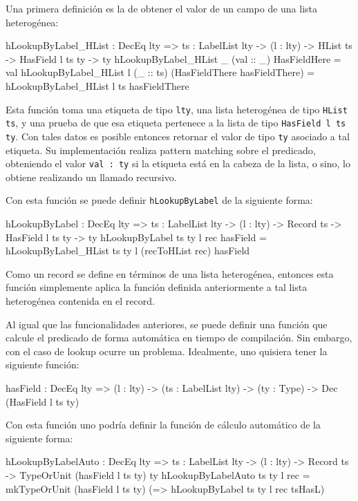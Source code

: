 Una primera definición es la de obtener el valor de un campo de una lista heterogénea:

\begin{code}
hLookupByLabel_HList : DecEq lty => {ts : LabelList lty} ->
  (l : lty) -> HList ts -> HasField l ts ty -> ty
hLookupByLabel_HList _ (val :: _) HasFieldHere = val
hLookupByLabel_HList l (_ :: ts) 
  (HasFieldThere hasFieldThere) =
  hLookupByLabel_HList l ts hasFieldThere
\end{code}

Esta función toma una etiqueta de tipo \texttt{lty}, una lista heterogénea de tipo \texttt{HList ts}, y una prueba de que esa etiqueta pertenece a la lista de tipo \texttt{HasField l ts ty}. Con tales datos es posible entonces retornar el valor de tipo \texttt{ty} asociado a tal etiqueta. Su implementación realiza pattern matching sobre el predicado, obteniendo el valor \texttt{val : ty} si la etiqueta está en la cabeza de la lista, o sino, lo obtiene realizando un llamado recursivo.

Con esta función se puede definir \texttt{hLookupByLabel} de la siguiente forma:

\begin{code}
hLookupByLabel : DecEq lty => {ts : LabelList lty} ->
  (l : lty) -> Record ts -> HasField l ts ty -> ty
hLookupByLabel {ts} {ty} l rec hasField =
  hLookupByLabel_HList {ts} {ty} l (recToHList rec) hasField
\end{code}

Como un record se define en términos de una lista heterogénea, entonces esta función simplemente aplica la función definida anteriormente a tal lista heterogénea contenida en el record.

Al igual que las funcionalidades anteriores, se puede definir una función que calcule el predicado de forma automática en tiempo de compilación. Sin embargo, con el caso de lookup ocurre un problema. Idealmente, uno quisiera tener la siguiente función:

\begin{code}
hasField : DecEq lty => (l : lty) ->
  (ts : LabelList lty) -> (ty : Type) ->
  Dec (HasField l ts ty)
\end{code}

Con esta función uno podría definir la función de cálculo automático de la siguiente forma:

\begin{code}
hLookupByLabelAuto : DecEq lty => {ts : LabelList lty} ->
  (l : lty) -> Record ts ->
  TypeOrUnit (hasField l ts ty) ty
hLookupByLabelAuto {ts} {ty} l rec =
  mkTypeOrUnit (hasField l ts ty)
  (\tsHasL => hLookupByLabel {ts} {ty} l rec tsHasL)
\end{code}

